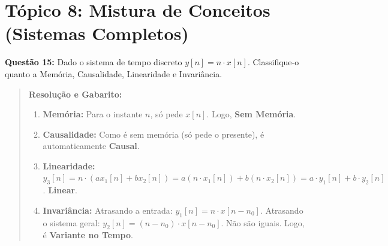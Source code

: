 \section{Tópico 8: Mistura de Conceitos (Sistemas Completos)}\label{tuxf3pico-8-mistura-de-conceitos-sistemas-completos}

\textbf{Questão 15:} Dado o sistema de tempo discreto \(y[n] = n \cdot x[n]\). Classifique-o quanto a Memória, Causalidade, Linearidade e Invariância.

\begin{quote}
\textbf{Resolução e Gabarito:}

\begin{enumerate}
\def\labelenumi{\arabic{enumi}.}
\tightlist
\item
  \textbf{Memória:} Para o instante \(n\), só pede \(x[n]\). Logo, \textbf{Sem Memória}.
\item
  \textbf{Causalidade:} Como é sem memória (só pede o presente), é automaticamente \textbf{Causal}.
\item
  \textbf{Linearidade:} \(y_3[n] = n \cdot (ax_1[n] + bx_2[n]) = a(n \cdot x_1[n]) + b(n \cdot x_2[n]) = a \cdot y_1[n] + b \cdot y_2[n]\). \textbf{Linear}.
\item
  \textbf{Invariância:} Atrasando a entrada: \(y_1[n] = n \cdot x[n-n_0]\). Atrasando o sistema geral: \(y_2[n] = (n-n_0) \cdot x[n-n_0]\). Não são iguais. Logo, é \textbf{Variante no Tempo}.
\end{enumerate}
\end{quote}
